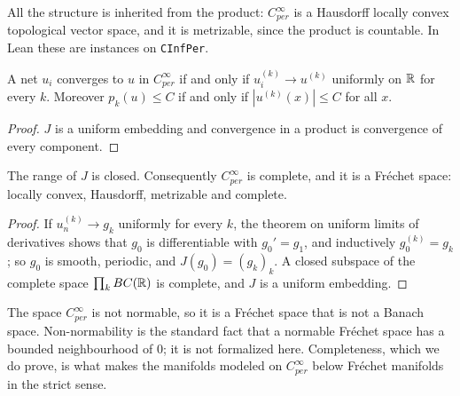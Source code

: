 All the structure is inherited from the product: $C^\infty_{per}$ is a Hausdorff locally convex
topological vector space, and it is metrizable, since the product is countable. In Lean these
are instances on \texttt{CInfPer}.

\begin{proposition}
  \label{prop:ex-cinfper-tendsto}
  \leanok
  A net $u_i$ converges to $u$ in $C^\infty_{per}$ if and only if $u_i^{(k)} \to u^{(k)}$
  uniformly on $\mathbb{R}$ for every $k$. Moreover $p_k(u) \le C$ if and only if
  $|u^{(k)}(x)| \le C$ for all $x$.
\end{proposition}

\begin{proof}
  \leanok
  $J$ is a uniform embedding and convergence in a product is convergence of every component.
\end{proof}

\begin{theorem}
  \label{thm:ex-cinfper-frechet}
  \leanok
  The range of $J$ is closed. Consequently $C^\infty_{per}$ is complete, and it is a Fréchet
  space: locally convex, Hausdorff, metrizable and complete.
\end{theorem}

\begin{proof}
  \leanok
  If $u_n^{(k)} \to g_k$ uniformly for every $k$, the theorem on uniform limits of derivatives
  shows that $g_0$ is differentiable with $g_0' = g_1$, and inductively $g_0^{(k)} = g_k$; so
  $g_0$ is smooth, periodic, and $J(g_0) = (g_k)_k$. A closed subspace of the complete space
  $\prod_k BC(\mathbb{R})$ is complete, and $J$ is a uniform embedding.
\end{proof}

\begin{remark}
  The space $C^\infty_{per}$ is not normable, so it is a Fréchet space that is not a Banach
  space. Non-normability is the standard fact that a normable Fréchet space has a bounded
  neighbourhood of $0$; it is not formalized here. Completeness, which we do prove, is what
  makes the manifolds modeled on $C^\infty_{per}$ below Fréchet manifolds in the strict sense.
\end{remark}

